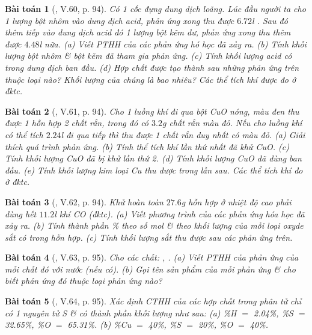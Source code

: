 \documentclass{article}
\newtheorem{baitoan}{Bài toán}
\begin{document}
\begin{baitoan}[\cite{Truong_BTNC_Hoa_Hoc_8_2022}, V.60, p. 94]
	Có 1 cốc đựng dung dịch \emph{} loãng. Lúc đầu người ta cho 1 lượng bột nhôm vào dung dịch acid, phản ứng xong thu được $6.72$\emph{l }. Sau đó thêm tiếp vào dung dịch acid đó 1 lượng bột kẽm dư, phản ứng xong thu thêm được $4.48$\emph{l } nữa. (a) Viết PTHH của các phản ứng hó học đã xảy ra. (b) Tính khối lượng bột nhôm \& bột kẽm đã tham gia phản ứng. (c) Tính khối lượng acid \emph{} có trong dung dịch ban đầu. (d) Hợp chất được tạo thành sau những phản ứng trên thuộc loại nào? Khối lượng của chúng là bao nhiêu? Các thể tích khí được đo ở đktc.
\end{baitoan}

\begin{baitoan}[\cite{Truong_BTNC_Hoa_Hoc_8_2022}, V.61, p. 94]
	Cho 1 luồng khí \emph{} đi qua bột \emph{CuO} nóng, màu đen thu được 1 hỗn hợp 2 chất rắn, trong đó có $3.2$\emph{g} chất rắn màu đỏ. Nếu cho luồng khí \emph{} có thể tích $2.24$\emph{l} đi qua tiếp thì thu được 1 chất rắn duy nhất có màu đỏ. (a) Giải thích quá trình phản ứng. (b) Tính thể tích khí \emph{} lần thứ nhất đã khử \emph{CuO}. (c) Tính khối lượng \emph{CuO} đã bị khử lần thứ 2. (d) Tính khối lượng \emph{CuO} đã dùng ban đầu. (e) Tính khối lượng kim loại \emph{Cu} thu được trong lần sau. Các thể tích khí đo ở đktc.
\end{baitoan}

\begin{baitoan}[\cite{Truong_BTNC_Hoa_Hoc_8_2022}, V.62, p. 94]
	Khử hoàn toàn $27.6$\emph{g} hỗn hợp \emph{} ở nhiệt độ cao phải dùng hết $11.2$\emph{l} khí \emph{CO} (đktc). (a) Viết phương trình của các phản ứng hóa học đã xảy ra. (b) Tính thành phần \% theo số mol \& theo khối lượng của mỗi loại oxyde sắt có trong hỗn hợp. (c) Tính khối lượng sắt thu được sau các phản ứng trên.
\end{baitoan}

\begin{baitoan}[\cite{Truong_BTNC_Hoa_Hoc_8_2022}, V.63, p. 95]
	Cho các chất: \emph{, }. (a) Viết PTHH của phản ứng của mỗi chất đó với nước (nếu có). (b) Gọi tên sản phẩm của mỗi phản ứng \& cho biết phản ứng đó thuộc loại phản ứng nào?
\end{baitoan}

\begin{baitoan}[\cite{Truong_BTNC_Hoa_Hoc_8_2022}, V.64, p. 95]
	Xác định CTHH của các hợp chất trong phân tử chỉ có 1 nguyên tử \emph{S} \& có thành phần khối lượng như sau: (a) \emph{\%H $=$ 2.04\%, \%S $=$ 32.65\%, \%O $=$ 65.31\%}. (b) \emph{\%Cu $=$ 40\%, \%S $=$ 20\%, \%O $=$ 40\%}.
\end{baitoan}
\end{document}
